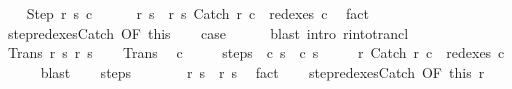 \begin{isabellebody}
\ \ \isamarkupfalse%
\ {\isacharparenleft}Step\ r{\isacharprime}\ s{\isacharprime}\ c{\isacharprime}{\isacharparenright}\ \isanewline
\ \ \isamarkupfalse%
\ {\isachardoublequoteopen}{\isasymGamma}{\isasymturnstile}\ {\isacharparenleft}r{\isacharcomma}\ s{\isacharparenright}\ {\isasymrightarrow}\ {\isacharparenleft}r{\isacharprime}{\isacharcomma}\ s{\isacharprime}{\isacharparenright}{\isachardoublequoteclose}\ {\isachardoublequoteopen}Catch\ r\ c\ {\isasymin}\ redexes\ c{\isacharprime}{\isachardoublequoteclose}\ \isamarkupfalse%
\ fact{\isacharplus}\isanewline
\ \ \isamarkupfalse%
\ step{\isacharunderscore}redexes{\isacharunderscore}Catch\ {\isacharbrackleft}OF\ this{\isacharbrackright}\isanewline
\ \ \isamarkupfalse%
\ {\isacharquery}case\isanewline
\ \ \ \ \isamarkupfalse%
\ {\isacharparenleft}blast\ intro{\isacharcolon}\ r{\isacharunderscore}into{\isacharunderscore}trancl{\isacharparenright}\isanewline
{}\isamarkupfalse%
\isanewline
\ \ \isamarkupfalse%
\ {\isacharparenleft}Trans\ r{\isacharprime}\ s{\isacharprime}\ r{\isacharprime}{\isacharprime}\ s{\isacharprime}{\isacharprime}{\isacharparenright}\isanewline
\ \ \isamarkupfalse%
\ Trans\ \isamarkupfalse%
\ c{\isacharprime}\ \isanewline
\ \ \ \ steps{\isacharcolon}\ {\isachardoublequoteopen}{\isasymGamma}{\isasymturnstile}\ {\isacharparenleft}c{\isacharcomma}\ s{\isacharparenright}\ {\isasymrightarrow}\isactrlsup {\isacharplus}\ {\isacharparenleft}c{\isacharprime}{\isacharcomma}\ s{\isacharprime}{\isacharparenright}{\isachardoublequoteclose}\ \isanewline
\ \ \ \ r{\isacharprime}{\isacharcolon}\ {\isachardoublequoteopen}Catch\ r{\isacharprime}\ c\ {\isasymin}\ redexes\ c{\isacharprime}{\isachardoublequoteclose}\isanewline
\ \ \ \ \isamarkupfalse%
\ blast\isanewline
\ \ \isamarkupfalse%
\ steps\isanewline
\ \ \isamarkupfalse%
\isanewline
\ \ \isamarkupfalse%
\ {\isachardoublequoteopen}{\isasymGamma}{\isasymturnstile}\ {\isacharparenleft}r{\isacharprime}{\isacharcomma}\ s{\isacharprime}{\isacharparenright}\ {\isasymrightarrow}\ {\isacharparenleft}r{\isacharprime}{\isacharprime}{\isacharcomma}\ s{\isacharprime}{\isacharprime}{\isacharparenright}{\isachardoublequoteclose}\ \isamarkupfalse%
\ fact\isanewline
\ \ \isamarkupfalse%
\ step{\isacharunderscore}redexes{\isacharunderscore}Catch\ {\isacharbrackleft}OF\ this\ r{\isacharprime}{\isacharbrackright}\ \isamarkupfalse%

\end{isabellebody}
